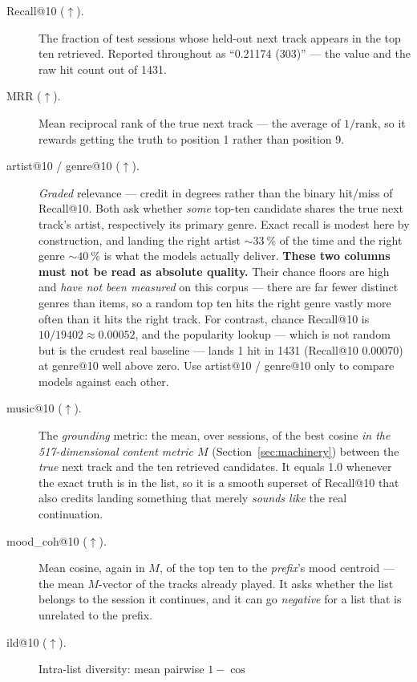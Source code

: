 \documentclass[11pt]{article}
\begin{document}
\begin{description}
  \item[Recall@10 ($\uparrow$).] The fraction of test sessions whose held-out
  next track appears in the top ten retrieved. Reported throughout as
  ``\num{0.21174} (\num{303})'' --- the value and the raw hit count out of
  \num{1431}.
  \item[MRR ($\uparrow$).] Mean reciprocal rank of the true next track --- the
  average of $1/\mathrm{rank}$, so it rewards getting the truth to position 1
  rather than position 9.
  \item[artist@10 / genre@10 ($\uparrow$).] \emph{Graded} relevance --- credit
  in degrees rather than the binary hit/miss of Recall@10. Both ask whether
  \emph{some} top-ten candidate shares the true next track's artist,
  respectively its primary genre. Exact recall is modest here by construction,
  and landing the right artist ${\sim}\SI{33}{\percent}$ of the time and the
  right genre ${\sim}\SI{40}{\percent}$ is what the models actually deliver.
  \textbf{These two columns must not be read as absolute quality.} Their chance
  floors are high and \emph{have not been measured} on this corpus --- there are
  far fewer distinct genres than items, so a random top ten hits the right genre
  vastly more often than it hits the right track. For contrast, chance Recall@10
  is $10/\num{19402}\approx\num{0.00052}$, and the popularity lookup ---
  which is not random but is the crudest real baseline --- lands \num{1} hit in
  \num{1431} (Recall@10 \num{0.00070}) at genre@10 well above zero. Use
  artist@10 / genre@10 only to compare models against each other.
  \item[music@10 ($\uparrow$).] The \emph{grounding} metric: the mean, over
  sessions, of the best cosine \emph{in the \num{517}-dimensional content metric
  $M$} (Section~\ref{sec:machinery}) between the \emph{true} next track and the
  ten retrieved candidates. It equals
  \num{1.0} whenever the exact truth is in the list, so it is a smooth superset
  of Recall@10 that also credits landing something that merely \emph{sounds
  like} the real continuation.
  \item[mood\_coh@10 ($\uparrow$).] Mean cosine, again in $M$, of the top ten to
  the \emph{prefix}'s mood centroid --- the mean $M$-vector of the tracks already
  played. It asks whether the list belongs to the session it continues, and it
  can go \emph{negative} for a list that is unrelated to the prefix.
  \item[ild@10 ($\uparrow$).] Intra-list diversity: mean pairwise $1-\cos$

\end{description}
\end{document}
